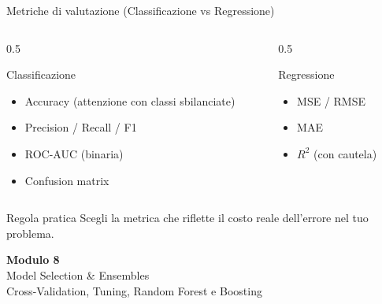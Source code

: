 \documentclass[aspectratio=169, 10pt]{beamer}
\begin{document}
\begin{frame}{Metriche di valutazione (Classificazione vs Regressione)}
    \begin{columns}[T]
        \begin{column}{0.5\textwidth}
            \begin{block}{Classificazione}
                \begin{itemize}
                    \item Accuracy (attenzione con classi sbilanciate)
                    \item Precision / Recall / F1
                    \item ROC-AUC (binaria)
                    \item Confusion matrix
                \end{itemize}
            \end{block}
        \end{column}
        \begin{column}{0.5\textwidth}
            \begin{block}{Regressione}
                \begin{itemize}
                    \item MSE / RMSE
                    \item MAE
                    \item $R^2$ (con cautela)
                \end{itemize}
            \end{block}
        \end{column}
    \end{columns}

    \vspace{0.5em}
    \begin{alertblock}{Regola pratica}
        Scegli la metrica che riflette il costo reale dell'errore nel tuo problema.
    \end{alertblock}
\end{frame}


\begin{frame}[plain]
    \centering
    \vspace{2cm}
    {\Huge \textbf{Modulo 8}}\\[0.5cm]
    {\Huge \textcolor{Accent}{Model Selection \& Ensembles}}\\[1cm]
    {\large Cross-Validation, Tuning, Random Forest e Boosting}
\end{frame}
\end{document}
